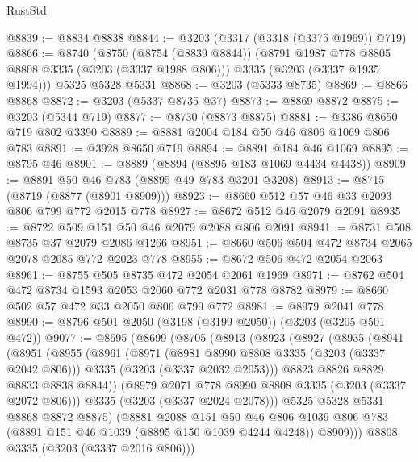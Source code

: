 \begin{lexlean}{RustStd}
\begin{coremodule}
@8839 := @8834 @8838
@8844 := @3203 (@3317 (@3318 (@3375 @1969)) @719)
@8866 := @8740
    (@8750
      (@8754 (@8839 @8844))
      (@8791 @1987 @778 @8805 @8808 @3335 (@3203 (@3337 @1988 @806)))
      @3335
      (@3203 (@3337 @1935 @1994)))
    @5325
    @5328
    @5331
@8868 := @3203 (@5333 @8735)
@8869 := @8866 @8868
@8872 := @3203 (@5337 @8735 @37)
@8873 := @8869 @8872
@8875 := @3203 (@5344 @719)
@8877 := @8730 (@8873 @8875)
@8881 := @3386 @8650 @719 @802 @3390
@8889 := @8881 @2004 @184 @50 @46 @806 @1069 @806 @783
@8891 := @3928 @8650 @719
@8894 := @8891 @184 @46 @1069
@8895 := @8795 @46
@8901 := @8889 (@8894 (@8895 @183 @1069 @4434 @4438))
@8909 := @8891 @50 @46 @783 (@8895 @49 @783 @3201 @3208)
@8913 := @8715 (@8719 (@8877 (@8901 @8909)))
@8923 := @8660 @512 @57 @46 @33 @2093 @806 @799 @772 @2015 @778
@8927 := @8672 @512 @46 @2079 @2091
@8935 := @8722 @509 @151 @50 @46 @2079 @2088 @806 @2091
@8941 := @8731 @508 @8735 @37 @2079 @2086 @1266
@8951 := @8660 @506 @504 @472 @8734 @2065 @2078 @2085 @772 @2023 @778
@8955 := @8672 @506 @472 @2054 @2063
@8961 := @8755 @505 @8735 @472 @2054 @2061 @1969
@8971 := @8762 @504 @472 @8734 @1593 @2053 @2060 @772 @2031 @778 @8782
@8979 := @8660 @502 @57 @472 @33 @2050 @806 @799 @772
@8981 := @8979 @2041 @778
@8990 := @8796 @501 @2050 (@3198 (@3199 @2050)) (@3203 (@3205 @501 @472))
@9077 := @8695
    (@8699
      (@8705
        (@8913
          (@8923
            (@8927
              (@8935
                (@8941
                  (@8951
                    (@8955
                      (@8961
                        (@8971
                          (@8981 @8990 @8808 @3335 (@3203 (@3337 @2042 @806)))
                          @3335
                          (@3203 (@3337 @2032 @2053)))
                        @8823
                        @8826
                        @8829
                        @8833
                        @8838
                        @8844))
                    (@8979 @2071 @778 @8990 @8808 @3335 (@3203 (@3337 @2072 @806)))
                    @3335
                    (@3203 (@3337 @2024 @2078)))
                  @5325
                  @5328
                  @5331
                  @8868
                  @8872
                  @8875)
                (@8881
                  @2088
                  @151
                  @50
                  @46
                  @806
                  @1039
                  @806
                  @783
                  (@8891 @151 @46 @1039 (@8895 @150 @1039 @4244 @4248))
                  @8909)))
            @8808
            @3335
            (@3203 (@3337 @2016 @806)))

\end{coremodule}
\end{lexlean}
